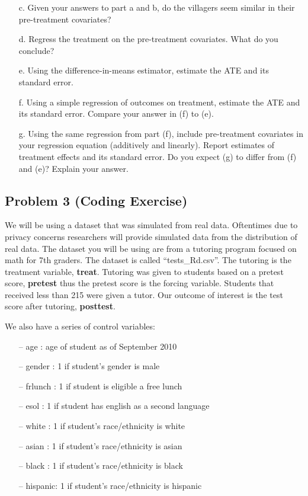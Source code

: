 \documentclass[]{tufte-handout}
\begin{document}
\begin{itemize}
\item[c.] Given your answers to part a and b, do the villagers seem similar in their pre-treatment covariates?

\item[d.] Regress the treatment on the pre-treatment covariates. What do you conclude?

\item[e.] Using the difference-in-means estimator, estimate the ATE and its standard error.

\item[f.] Using a simple regression of outcomes on treatment, estimate the ATE and its standard error. Compare your answer in (f) to (e).

\item[g.] Using the same regression from part (f), include pre-treatment covariates in your regression equation (additively and linearly). Report estimates of treatment effects and its standard error. Do you expect (g) to differ from (f) and (e)? Explain your answer.

\end{itemize}

\hypertarget{problem-3-coding-exercise}{%
\subsection{Problem 3 (Coding
Exercise)}\label{problem-3-coding-exercise}}

We will be using a dataset that was simulated from real data. Oftentimes
due to privacy concerns researchers will provide simulated data from the
distribution of real data. The dataset you will be using are from a
tutoring program focused on math for 7th graders. The dataset is called
``tests\_Rd.csv''. The tutoring is the treatment variable,
\textbf{treat}. Tutoring was given to students based on a pretest score,
\textbf{pretest} thus the pretest score is the forcing variable.
Students that received less than 215 were given a tutor. Our outcome of
interest is the test score after tutoring, \textbf{posttest}.

We also have a series of control variables:

\begin{itemize}
  \item[--] age     : age of student as of September 2010
  \item[--] gender  : 1 if student's gender is male
  \item[--] frlunch : 1 if student is eligible a free lunch
  \item[--] esol    : 1 if student has english as a second language
  \item[--] white   : 1 if student's race/ethnicity is white
  \item[--] asian   : 1 if student's race/ethnicity is asian
  \item[--] black   : 1 if student's race/ethnicity is black
  \item[--] hispanic: 1 if student's race/ethnicity is hispanic
\end{itemize}
\end{document}

